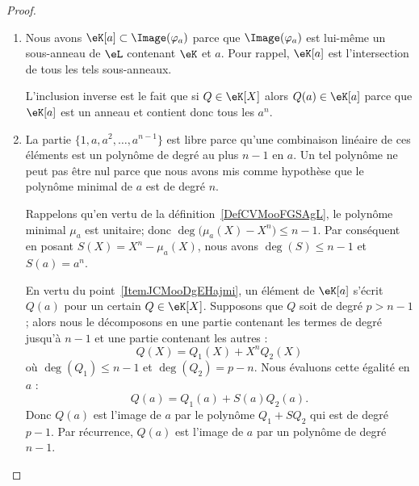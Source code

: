 \begin{proof}
	\begin{enumerate}
		\item
		      Nous avons \( \eK[a]\subset \Image(\varphi_a)\) parce que \( \Image(\varphi_a)\) est lui-même un sous-anneau de \( \eL\) contenant \( \eK\) et \( a\). Pour rappel, \( \eK[a]\) est l'intersection de tous les tels sous-anneaux.

		      L'inclusion inverse est le fait que si \( Q\in \eK[X]\) alors \( Q(a)\in \eK[a]\) parce que \( \eK[a]\) est un anneau et contient donc tous les \( a^n\).
		\item
		      La partie \( \{ 1,a,a^2,\ldots, a^{n-1} \}\) est libre parce qu'une combinaison linéaire de ces éléments est un polynôme de degré au plus \( n-1\) en \( a\). Un tel polynôme ne peut pas être nul parce que nous avons mis comme hypothèse que le polynôme minimal de \( a\) est de degré \( n\).

		      Rappelons qu'en vertu de la définition~\ref{DefCVMooFGSAgL}, le polynôme minimal \( \mu_a\) est unitaire; donc  \( \deg\big(\mu_a(X)-X^n\big)\leq n-1\). Par conséquent en posant \( S(X)=X^n-\mu_a(X)\), nous avons \( \deg(S)\leq n-1\) et \( S(a)=a^n\).

		      En vertu du point~\ref{ItemJCMooDgEHajmi}, un élément de \( \eK[a]\) s'écrit \( Q(a)\) pour un certain \( Q\in\eK[X]\). Supposons que \( Q\) soit de degré \( p>n-1\); alors nous le décomposons en une partie contenant les termes de degré jusqu'à \( n-1\) et une partie contenant les autres :
		      \begin{equation}
			      Q(X)=Q_1(X)+X^nQ_2(X)
		      \end{equation}
		      où \( \deg(Q_1)\leq n-1\) et \( \deg(Q_2)=p-n\). Nous évaluons cette égalité en \( a\) :
		      \begin{equation}
			      Q(a)=Q_1(a)+S(a)Q_2(a).
		      \end{equation}
		      Donc \( Q(a)\) est l'image de \( a\) par le polynôme \( Q_1+SQ_2\) qui est de degré \( p-1\). Par récurrence, \( Q(a)\) est l'image de \( a\) par un polynôme de degré \( n-1\).


\end{enumerate}
\end{proof}
